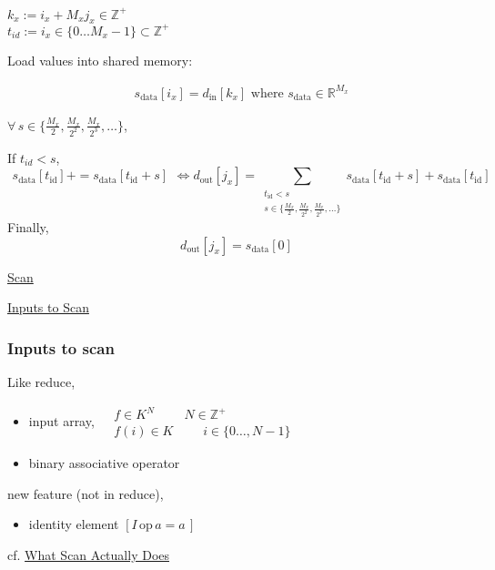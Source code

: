 \documentclass[10pt]{amsart}
\begin{document}
\begin{multicols*}{2}
$k_x := i_x + M_x j_x \in \mathbb{Z}^+$ \\
$t_{id} := i_x \in \lbrace 0 \dots M_x-1\rbrace \subset \mathbb{Z}^+$

Load values into shared memory:

\[
\begin{aligned} 
  & s_{\text{data}}[i_x] = d_{\text{in}}[k_x]  \text{ where }  s_{\text{data}}  \in \mathbb{R}^{M_x} 
 \end{aligned}
\]

$\forall \, s \in \lbrace \frac{M_x}{2}, \frac{M_x}{2^2}, \frac{M_x}{2^3}, \dots \rbrace $, 

If $t_{id} < s$,
\[
\begin{gathered}
s_{\text{data}}[t_{\text{id}}] += s_{\text{data}}[t_{\text{id}} + s]
\end{gathered} \Longleftrightarrow d_{\text{out}}[j_x] = \sum_{ \substack{ t_{\text{id}} < s \\ s \in \lbrace \frac{M_x}{2}, \frac{M_x}{2^2}, \frac{M_x}{2^3} , \dots \rbrace } } s_{\text{data}}[t_{\text{id}} + s] + s_{\text{data}}[t_{\text{id}}]
\]
Finally,
\[
d_{\text{out}}[j_x] = s_{\text{data}}[0]
\]


\href{https://classroom.udacity.com/courses/cs344/lessons/86719951/concepts/873907110923#}{Scan}

\href{https://classroom.udacity.com/courses/cs344/lessons/86719951/concepts/877097890923#}{Inputs to Scan}

\subsubsection*{Inputs to scan}

Like reduce,
\begin{itemize}
  \item input array, $\begin{aligned} & f \in K^N \, \qquad \, N \in \mathbb{Z}^+ \\ & f(i) \in K \, \qquad \, i \in \lbrace 0 \dots , N-1 \rbrace \end{aligned}$
  \item binary associative operator
  \end{itemize}
new feature (not in reduce),
\begin{itemize}
  \item identity element $[I \, \text{op} \, a = a \, ]$  
  \end{itemize}


cf. \href{https://classroom.udacity.com/courses/cs344/lessons/86719951/concepts/878394960923}{What Scan Actually Does}


\end{multicols*}
\end{document}
